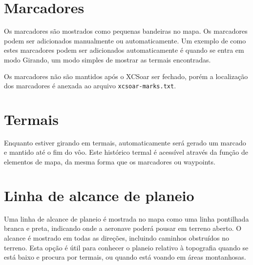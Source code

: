 \section{Marcadores}\label{sec:markers}

Os marcadores são mostrados como pequenas bandeiras no mapa.  Os marcadores podem ser adicionados manualmente ou automaticamente.  Um exemplo de como estes marcadores podem ser adicionados automaticamente é quando se entra em modo Girando, um modo simples de mostrar as termais encontradas.

Os marcadores não são mantidos após o XCSoar ser fechado, porém a localização dos marcadores é anexada ao arquivo \verb|xcsoar-marks.txt|.

\section{Termais}

Enquanto estiver girando em termais, automaticamente será gerado um marcado e mantido até o 
fim do vôo.  Este histórico termal é acessível através da função de elementos de mapa, da 
mesma forma que os marcadores ou waypoints.


\section{Linha de alcance de planeio}\label{sec:reach}

Uma linha de alcance de planeio é mostrada no mapa como uma linha pontilhada branca e 
preta, indicando onde a aeronave poderá pousar em terreno aberto.  O alcance é mostrado 
em todas as direções, incluindo caminhos obstruídos no terreno.  Esta opção é útil para 
conhecer o planeio relativo à topografia quando se está baixo e procura por termais, ou 
quando está voando em áreas montanhosas.

